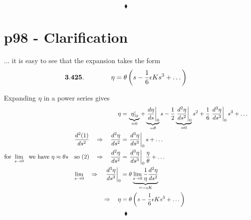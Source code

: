 $$\blacklozenge$$
\newpage

\section{p98 - Clarification}
\begin{tcolorbox}
... it is easy to see that the expansion takes the form $$\mathbf{3.425.}\quad\quad\quad\quad  \eta=\theta\left(s-\frac{1}{6}\epsilon K s^3 + \dots\right)$$
\end{tcolorbox}
Expanding $\eta$ in a power series gives
\begin{align}
\eta &= \underbrace{\left.\eta\right|_0}_{=0} + \underbrace{\left.\dv{\eta}{s}\right|_0 }_{=\theta}s -\frac{1}{2}\underbrace{\left.\dv[2]{\eta}{s}\right|_0}_{=0}s^2 + \frac{1}{6}\left.\dv[3]{\eta}{s}\right|_0s^3 + \dots \\ 
\dv[2]{(1)}{s} \quad \Rightarrow\quad \dv[2]{\eta}{s} &=\left.\dv[3]{\eta}{s}\right|_0s+ \dots\\
\text{for } \lim_{ s \to 0} \ \text{ we have } \eta \approx \theta s \quad \text{so (2)} \quad \Rightarrow\quad \dv[2]{\eta}{s} &=\left.\dv[3]{\eta}{s}\right|_0\frac{\eta}{\theta}+ \dots\\
\lim_{ s \to 0}\quad \Rightarrow \quad \left.\dv[3]{\eta}{s}\right|_0 &= \theta\underbrace{\lim_{ s \to 0}\frac{1}{\eta}\dv[2]{\eta}{s}}_{= -\epsilon K}\\
\Rightarrow \quad \eta&=\theta\left(s-\frac{1}{6}\epsilon K s^3 + \dots\right)
\end{align}
$$\blacklozenge$$
\newpage


